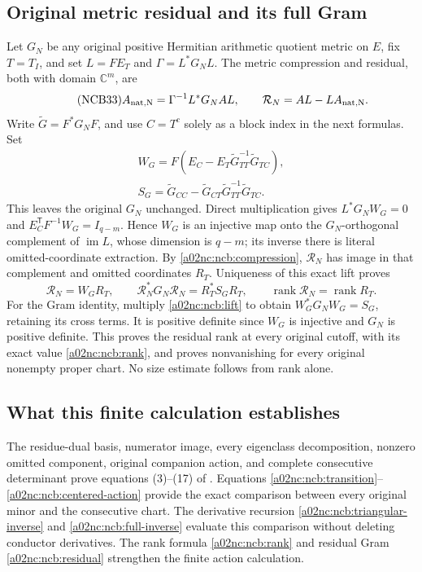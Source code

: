 \documentclass[11pt,a4paper]{article}
\begin{document}
\subsection{Original metric residual and its full Gram}
Let $G_N$ be any original positive Hermitian arithmetic quotient metric
on $E$, fix $T=T_I$, and set $L=FE_T$ and $\Gamma=L^*G_NL$.
The metric compression and residual, both with domain $\mathbb C^m$,
are
\begin{equation}\tag{NCB33}\label{a02nc:ncb:compression}
A_{\rm nat,N}=\Gamma^{-1}L^*G_NAL,\qquad
\mathcal R_N=AL-LA_{\rm nat,N}.
\end{equation}
Write $\widetilde G=F^*G_NF$, and use $C=T^c$ solely as a block
index in the next formulas. Set
\begin{equation}\tag{NCB34}\label{a02nc:ncb:lift}
\begin{gathered}
W_G=F(E_C-E_T\widetilde G_{TT}^{-1}\widetilde G_{TC}),\\
S_G=\widetilde G_{CC}
 -\widetilde G_{CT}\widetilde G_{TT}^{-1}\widetilde G_{TC}.
\end{gathered}
\end{equation}
This leaves the original $G_N$ unchanged. Direct multiplication gives
$L^*G_NW_G=0$ and $E_C^{\mathsf T}F^{-1}W_G=I_{q-m}$.
Hence $W_G$ is an injective map onto the $G_N$-orthogonal complement
of $\operatorname{im}L$, whose dimension is $q-m$; its inverse there
is literal omitted-coordinate extraction.
By \eqref{a02nc:ncb:compression}, $\mathcal R_N$ has image in that
complement and omitted coordinates $R_T$. Uniqueness of this exact
lift proves
\begin{equation}\tag{NCB35}\label{a02nc:ncb:residual}
\mathcal R_N=W_GR_T,\qquad
\mathcal R_N^*G_N\mathcal R_N=R_T^*S_GR_T,\qquad
\operatorname{rank}\mathcal R_N=\operatorname{rank}R_T .
\end{equation}
For the Gram identity, multiply \eqref{a02nc:ncb:lift} to obtain
$W_G^*G_NW_G=S_G$, retaining its cross terms.
It is positive definite since $W_G$ is injective and $G_N$ is
positive definite. This proves the residual rank at every original
cutoff, with its exact value \eqref{a02nc:ncb:rank}, and proves nonvanishing
for every original nonempty proper chart. No size estimate follows
from rank alone.

\subsection{What this finite calculation establishes}
The residue-dual basis, numerator image, every eigenclass
decomposition, nonzero omitted component, original companion action,
and complete consecutive determinant prove equations (3)--(17) of
\cite{a02nc:prog:arrival02}. Equations
\eqref{a02nc:ncb:transition}--\eqref{a02nc:ncb:centered-action} provide the exact
comparison between every original minor and the consecutive chart.
The derivative recursion \eqref{a02nc:ncb:triangular-inverse} and
\eqref{a02nc:ncb:full-inverse} evaluate this comparison without deleting
conductor derivatives. The rank formula \eqref{a02nc:ncb:rank} and residual
Gram \eqref{a02nc:ncb:residual} strengthen the finite action calculation.
\end{document}
